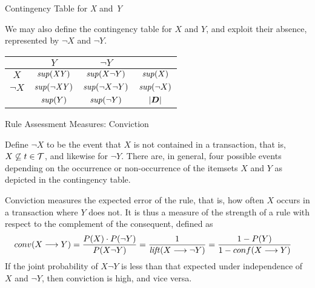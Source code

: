 \begin{frame}{Contingency Table for {\it X} and {\it Y}}

We may also define the contingency table for $X$ and $Y$, and exploit their absence, represented by $\neg X$ and $\neg Y$.

\begin{center}
\begin{tabular}{|c|cc||c|}
    \hline
    & $Y$ & $\neg Y$ & \\
    \hline
  $X$ & $\mathit{sup}(\mathit{XY})$ & $\mathit{sup}(X\neg Y)$ & $\mathit{sup}(X)$\\
  $\neg X$ & $\mathit{sup}(\neg \mathit{XY})$ & $\mathit{sup}(\neg X\neg Y)$ & $\mathit{sup}(\neg X)$\\
  \hline\hline
  & $\mathit{sup}(Y)$ & $\mathit{sup}(\neg Y)$ & $|{\boldsymbol D}|$\\
  \hline
  \end{tabular}%
\end{center}
\end{frame}

\begin{frame}{Rule Assessment Measures: Conviction}

Def\/{i}ne $\neg X$ to be the
event that $X$ is not contained in a transaction, that is,  $X
\not\subseteq t\in {\mathcal T}$, and likewise for $\neg Y$.  There are, in
general, four possible events depending on the occurrence or
non-occurrence of the itemsets $X$ and $Y$ as depicted in the
contingency table.

\medskip
Conviction 
measures the expected error of the rule, that is, how often
$X$ occurs in a transaction where $Y$ does not.
It is thus a measure of the strength of a rule with respect to the
complement of the consequent, def\/{i}ned as
\begin{align*}
  \conviction(X \arule Y) &
  = \frac{P(X) \cdot P(\neg Y)}{P(X \neg Y)}
  = \frac{1}{\lift(X \arule \neg Y)} 
	= \frac{1-P(Y)}{1-conf(X \arule Y)}
\end{align*}
If the joint
probability of $X\neg Y$ is less than that expected under independence
of $X$ and $\neg Y$, then
conviction is high, and vice versa. 
\end{frame}


